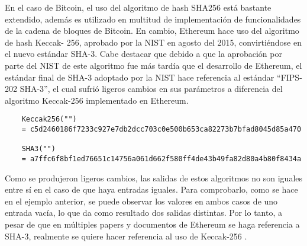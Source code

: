       En el caso de Bitcoin, el uso del algoritmo de hash SHA256 está bastante extendido,
      además es utilizado en multitud de implementación de funcionalidades de la cadena
      de bloques de Bitcoin. En cambio, Ethereum hace uso del algoritmo de hash Keccak-
      256, aprobado por la NIST en agosto del 2015, convirtiéndose en el nuevo estándar
      SHA-3.
      Cabe destacar que debido a que la aprobación por parte del NIST de este algoritmo fue más tardía que el desarrollo de Ethereum, el 
      estándar final de SHA-3 adoptado por
      la NIST hace referencia al estándar “FIPS-202 SHA-3”, el cual sufrió ligeros cambios
      en sus parámetros a diferencia del algoritmo Keccak-256 implementado en Ethereum.

      \begin{verbatim}
    Keccak256("")
    = c5d2460186f7233c927e7db2dcc703c0e500b653ca82273b7bfad8045d85a470

    SHA3("")
    = a7ffc6f8bf1ed76651c14756a061d662f580ff4de43b49fa82d80a4b80f8434a
      \end{verbatim}

      Como se produjeron ligeros cambios, las salidas de estos algoritmos no son iguales
      entre sí en el caso de que haya entradas iguales. Para comprobarlo, como se hace en
      el ejemplo anterior, se puede observar los valores en ambos casos de uno entrada vacía, lo
      que da como resultado dos salidas distintas. Por lo tanto, a pesar de que en múltiples
      papers y documentos de Ethereum se haga referencia a SHA-3, realmente se quiere
      hacer referencia al uso de Keccak-256 \parencite{taibo2022}.

